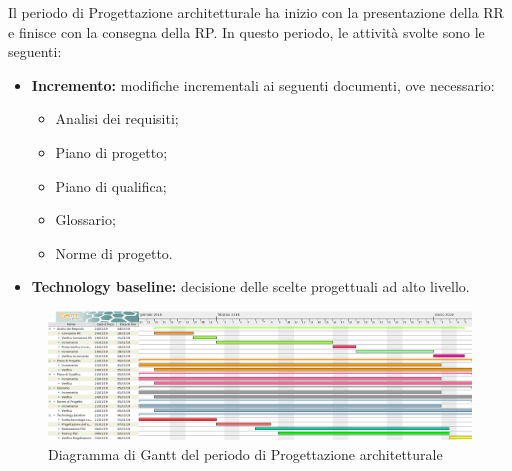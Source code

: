 Il periodo di Progettazione architetturale ha inizio con la presentazione della RR e finisce con la consegna della RP.\newline
In questo periodo, le attività svolte sono le seguenti:
\begin{itemize}
	\item \textbf{Incremento: }modifiche incrementali ai seguenti documenti, ove necessario:
	\begin{itemize}
		\item Analisi dei requisiti;
		\item Piano di progetto;
		\item Piano di qualifica;
		\item Glossario;
		\item Norme di progetto.
	\end{itemize}
	\item \textbf{Technology baseline:} decisione delle scelte progettuali ad alto livello.
\end{itemize}

\begin{figure}[H]
	\begin{center}
		\includegraphics[width=17cm,height=\textheight,keepaspectratio]{Pianificazione/Progettazione.png}
	\caption{Diagramma di Gantt del periodo di Progettazione architetturale}
	\end{center}
\end{figure}